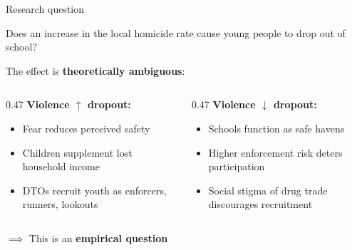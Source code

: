 \documentclass[aspectratio=169]{beamer}
\begin{document}
\begin{frame}{Research question}

    \begin{block}{}
        \centering
        Does an increase in the local homicide rate cause young people to drop out of school?
    \end{block}

\vspace{0.5cm}
\pause

The effect is \textbf{theoretically ambiguous}:

\vspace{0.3cm}
\begin{columns}
\begin{column}{0.47\textwidth}
    \textbf{Violence $\uparrow$ dropout:}
    \begin{itemize}
        \item Fear reduces perceived safety
        \item Children supplement lost household income
        \item DTOs recruit youth as enforcers, runners, lookouts
    \end{itemize}
\end{column}
\begin{column}{0.47\textwidth}
    \textbf{Violence $\downarrow$ dropout:}
    \begin{itemize}
        \item Schools function as safe havens
        \item Higher enforcement risk deters participation
        \item Social stigma of drug trade discourages recruitment
    \end{itemize}
\end{column}
\end{columns}

\vspace{0.5cm}
\pause
$\implies$ This is an \textbf{empirical question}

\end{frame}
\end{document}
